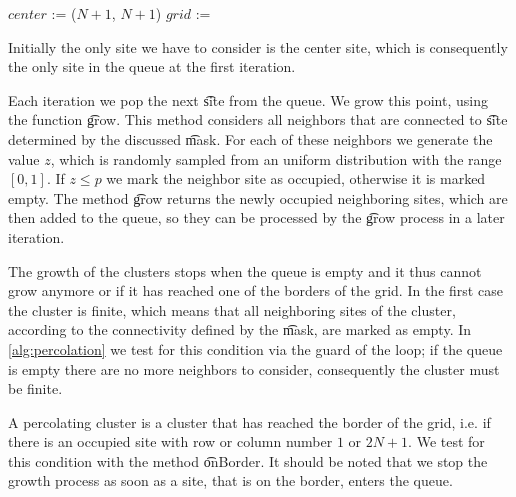 \begin{algorithm}[t]
	\SetAlgoShortEnd
	\DontPrintSemicolon
	\BlankLine

	$center$ := ($N + 1$, $N + 1$)\; 
	\; 
	$grid$ := \; 

	\; 
	\caption{$(mask, N, p)$\label{alg:percolation}}
\end{algorithm}

Initially the only site we have to consider is the center site, which is consequently the only site in the queue at the first iteration.

Each iteration we pop the next \t{site} from the queue. We grow this point, using the function \t{grow}. This method considers all neighbors that are connected to \t{site} determined by the discussed \t{mask}. For each of these neighbors we generate the value $z$, which is randomly sampled from an uniform distribution with the range $[0,1]$. If $z \leq p$ we mark the neighbor site as occupied, otherwise it is marked empty. The method \t{grow} returns the newly occupied neighboring sites, which are then added to the queue, so they can be processed by the \t{grow} process in a later iteration.

The growth of the clusters stops when the queue is empty and it thus cannot grow anymore or if it has reached one of the borders of the grid. In the first case the cluster is finite, which means that all neighboring sites of the cluster, according to the connectivity defined by the \t{mask}, are marked as empty. In \cref{alg:percolation} we test for this condition via the guard of the loop; if the queue is empty there are no more neighbors to consider, consequently the cluster must be finite. 

A percolating cluster is a cluster that has reached the border of the grid, i.e. if there is an occupied site with row or column number $1$ or $2N + 1$. We test for this condition with the method \t{onBorder}. It should be noted that we stop the growth process as soon as a site, that is on the border, enters the queue.\\

